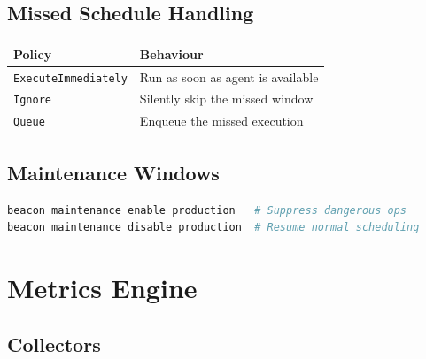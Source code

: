 \documentclass[12pt,a4paper]{article}
\begin{document}
\subsection{Missed Schedule Handling}

\begin{center}
\begin{tabular}{ll}
\toprule
Policy & Behaviour \\
\midrule
\texttt{ExecuteImmediately} & Run as soon as agent is available \\
\texttt{Ignore}             & Silently skip the missed window \\
\texttt{Queue}              & Enqueue the missed execution \\
\bottomrule
\end{tabular}
\end{center}

\subsection{Maintenance Windows}

\begin{lstlisting}[language=bash]
beacon maintenance enable production   # Suppress dangerous ops
beacon maintenance disable production  # Resume normal scheduling
\end{lstlisting}

\section{Metrics Engine}

\subsection{Collectors}
\end{document}
